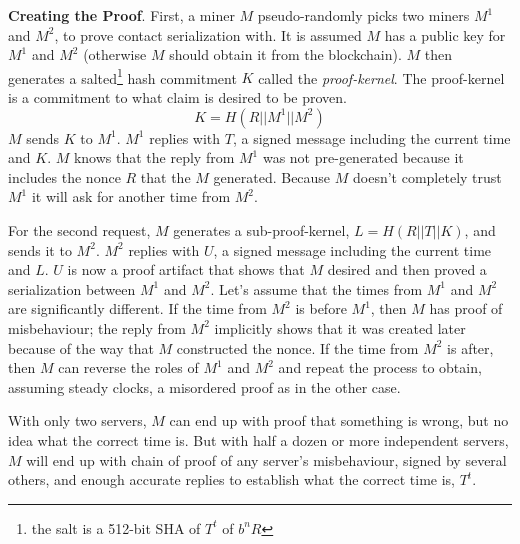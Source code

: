 \documentclass[letterpaper,11pt]{article}
\begin{document}
\textbf{Creating the Proof}. First, a miner $\mathit{M}$ pseudo-randomly picks two miners $\mathit{M^1}$ and $\mathit{M^2}$, to prove contact serialization with. It is assumed $\mathit{M}$ has a public key for $\mathit{M^1}$ and $\mathit{M^2}$ (otherwise $\mathit{M}$ should obtain it from the blockchain). $\mathit{M}$ then generates a salted\footnote{the salt is a 512-bit SHA of $\mathit{T^t}$ of $\mathit{b^n}$$R$} hash commitment $\mathit{K}$ called the \emph{proof-kernel}. The proof-kernel is a commitment to what claim is desired to be proven. $$\mathit{K} = \mathit{H}(R || \mathit{M^1} || \mathit{M^2})$$ $\mathit{M}$ sends $\mathit{K}$ to $\mathit{M^1}$. $\mathit{M^1}$ replies with $\mathit{T}$, a signed message including the current time and $\mathit{K}$. $\mathit{M}$ knows that the reply from $\mathit{M^1}$ was not pre-generated because it includes the nonce $R$ that the $\mathit{M}$ generated. Because $\mathit{M}$ doesn't completely trust $\mathit{M^1}$ it will ask for another time from $\mathit{M^2}$.\newline

For the second request, $\mathit{M}$ generates a sub-proof-kernel, $\mathit{L} = \mathit{H}(R || \mathit{T} || \mathit{K})$, and sends it to $\mathit{M^2}$. $\mathit{M^2}$ replies with $\mathit{U}$, a signed message including the current time and $\mathit{L}$. $\mathit{U}$ is now a proof artifact that shows that $\mathit{M}$ desired and then proved a serialization between $\mathit{M^1}$ and $\mathit{M^2}$. Let's assume that the times from $\mathit{M^1}$ and $\mathit{M^2}$ are significantly different. If the time from $\mathit{M^2}$ is before $\mathit{M^1}$, then $\mathit{M}$ has proof of misbehaviour; the reply from $\mathit{M^2}$ implicitly shows that it was created later because of the way that $\mathit{M}$ constructed the nonce. If the time from $\mathit{M^2}$ is after, then $\mathit{M}$ can reverse the roles of $\mathit{M^1}$ and $\mathit{M^2}$ and repeat the process to obtain, assuming steady clocks, a misordered proof as in the other case.\newline

With only two servers, $\mathit{M}$ can end up with proof that something is wrong, but no idea what the correct time is. But with half a dozen or more independent servers, $\mathit{M}$ will end up with chain of proof of any server's misbehaviour, signed by several others, and enough accurate replies to establish what the correct time is, $\mathit{T^t}$.\newline
\end{document}
